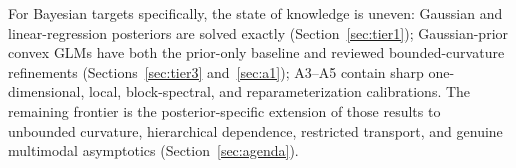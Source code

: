 \documentclass[../main.tex]{subfiles}
\begin{document}
For Bayesian targets specifically, the state of knowledge is uneven: Gaussian and
linear-regression posteriors are solved exactly (Section~\ref{sec:tier1}); Gaussian-prior convex
GLMs have both the prior-only baseline and reviewed bounded-curvature refinements
(Sections~\ref{sec:tier3} and~\ref{sec:a1}); A3--A5 contain sharp one-dimensional, local,
block-spectral, and reparameterization calibrations. The remaining frontier is the
posterior-specific extension of those results to unbounded curvature, hierarchical dependence,
restricted transport, and genuine multimodal asymptotics (Section~\ref{sec:agenda}).
\end{document}
